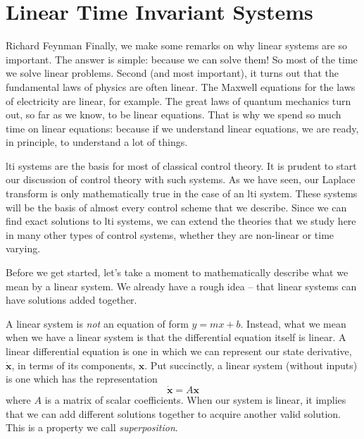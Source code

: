 \newpage
\printendnotes


\chapter{Linear Time Invariant Systems}\label{chap: lti}

\begin{chapquote}{Richard Feynman}
    Finally, we make some remarks on why linear systems are so important. The answer is simple: because we can solve them! So most of the time we solve linear problems. Second (and most important), it turns out that the fundamental laws of physics are often linear. The Maxwell equations for the laws of electricity are linear, for example. The great laws of quantum mechanics turn out, so far as we know, to be linear equations. That is why we spend so much time on linear equations: because if we understand linear equations, we are ready, in principle, to understand a lot of things.
\end{chapquote}

\Gls{lti} systems are the basis for most of classical control theory. It is prudent to start our discussion of control theory with such systems. As we have seen, our Laplace transform is only mathematically true in the case of an \gls{lti} system. These systems will be the basis of almost every control scheme that we describe. Since we can find exact solutions to \gls{lti} systems, we can extend the theories that we study here in many other types of control systems, whether they are non-linear or time varying.

Before we get started, let's take a moment to mathematically describe what we mean by a linear system. We already have a rough idea -- that linear systems can have solutions added together. 

A linear system is \textit{not} an equation of form $y=mx+b$. Instead, what we mean when we have a linear system is that the differential equation itself is linear. A linear differential equation is one in which we can represent our state derivative, $\bm{\dot{x}}$, in terms of its components, $\bm{x}$. Put succinctly, a linear system (without inputs) is one which has the representation
$$\bm{\dot{x}}=A\bm{x}$$
where $A$ is a matrix of scalar coefficients. When our system is linear, it implies that we can add different solutions together to acquire another valid solution. This is a property we call \textit{superposition}.

